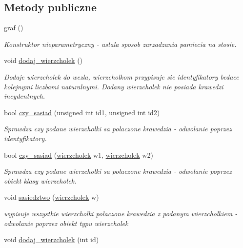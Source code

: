 \subsection*{Metody publiczne}
\begin{DoxyCompactItemize}
\item 
\hyperlink{classgraf_a6dc94b859678110f1bc85095a55bbee4}{graf} ()
\begin{DoxyCompactList}\small\item\em Konstruktor nieparametryczny -\/ ustala sposob zarzadzania pamiecia na stosie. \end{DoxyCompactList}\item 
void \hyperlink{classgraf_afaa55f5a9aef1f30a2b3be97b59a476b}{dodaj\-\_\-wierzcholek} ()
\begin{DoxyCompactList}\small\item\em Dodaje wierzcholek do wezla, wierzcholkom przypisuje sie identyfikatory bedace kolejnymi liczbami naturalnymi. Dodany wierzcholek nie posiada krawedzi incydentnych. \end{DoxyCompactList}\item 
bool \hyperlink{classgraf_a699329f1a383e2a5816e969498af6eb4}{czy\-\_\-sasiad} (unsigned int id1, unsigned int id2)
\begin{DoxyCompactList}\small\item\em Sprawdza czy podane wierzcholki sa polaczone krawedzia -\/ odwolanie poprzez identyfikatory. \end{DoxyCompactList}\item 
bool \hyperlink{classgraf_a617db5b49d65cd716b24c8b4930dec2a}{czy\-\_\-sasiad} (\hyperlink{classwierzcholek}{wierzcholek} w1, \hyperlink{classwierzcholek}{wierzcholek} w2)
\begin{DoxyCompactList}\small\item\em Sprawdza czy podane wierzcholki sa polaczone krawedzia -\/ odwolanie poprzez obiekt klasy wierzcholek. \end{DoxyCompactList}\item 
void \hyperlink{classgraf_ac72411b348f0025613cb03eeb27b9594}{sasiedztwo} (\hyperlink{classwierzcholek}{wierzcholek} w)
\begin{DoxyCompactList}\small\item\em wypisuje wszystkie wierzcholki polaczone krawedzia z podanym wierzcholkiem -\/ odwolanie poprzez obiekt typu wierzcholek \end{DoxyCompactList}\item 
void \hyperlink{classgraf_a8b81ec6754b796abb926a750a4ed6025}{dodaj\-\_\-wierzcholek} (int id)

\end{DoxyCompactItemize}
